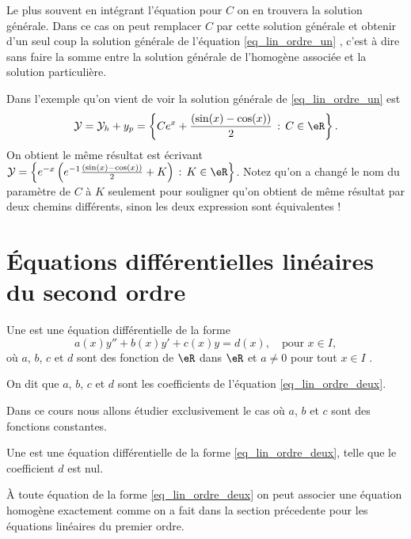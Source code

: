 \begin{remark}
  Le plus souvent en intégrant l'équation pour $C$ on en trouvera la solution générale. Dans ce cas on peut remplacer $C$ par cette solution générale et obtenir d'un seul coup la solution générale de l'équation \eqref{eq_lin_ordre_un} , c'est à dire sans faire la somme entre la solution générale de l'homogène associée et la solution particulière.  

  \begin{example}
    Dans l'exemple qu'on vient de voir la solution générale de \eqref{eq_lin_ordre_un} est 
    \begin{equation}
      \mathcal{Y} = \mathcal{Y}_h + y_p = \left\{Ce^x + \frac{(\sin(x)-\cos(x))}{2} \,:\, C\in\eR\right\}. 
    \end{equation}
On obtient le m\^eme résultat est écrivant $\mathcal{Y} = \left\{e^{-x}\left(e^{-1}\frac{(\sin(x)-\cos(x))}{2} +K \right) \,:\, K\in\eR\right\}$. Notez qu'on a changé le nom du paramètre de $C$ à $K$ seulement pour souligner qu'on obtient de m\^eme résultat par deux chemins différents, sinon les deux expression sont équivalentes !
  \end{example}
\end{remark}

\section{Équations différentielles linéaires du second ordre}
\label{Secordredeux}

\begin{definition}
Une   est une équation différentielle de la forme 
\begin{equation}\label{eq_lin_ordre_deux}
  a(x)y'' + b(x) y' + c(x)y = d(x), \quad\text{pour } x\in I, 
\end{equation}
o\`u $a$, $b$, $c$ et $d$ sont des fonction de $\eR$ dans $\eR$ et $a\neq 0$ pour tout $x\in I$ . 

On dit que $a$, $b$, $c$ et $d$ sont les coefficients de l'équation \eqref{eq_lin_ordre_deux}.
\end{definition}
Dans ce cours nous allons étudier exclusivement le cas où $a$, $b$ et $c$ sont des fonctions constantes. 
\begin{definition}
Une   est une équation différentielle de la forme \eqref{eq_lin_ordre_deux}, telle que le coefficient $d$ est nul.
\end{definition}
À toute équation de la forme \eqref{eq_lin_ordre_deux} on peut associer une équation homogène exactement comme on a fait dans la section précedente pour les équations linéaires du premier ordre.
